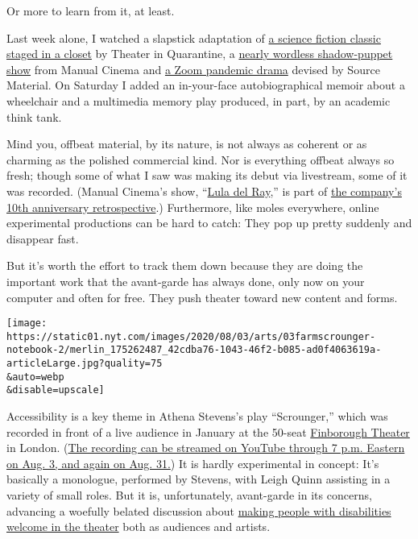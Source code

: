 Or more to learn from it, at least.

Last week alone, I watched a slapstick adaptation of
\href{https://www.nytimes.com/2020/07/31/theater/the-7th-voyage-of-egon-tichy-review.html}{a
science fiction classic staged in a closet} by Theater in Quarantine, a
\href{http://manualcinema.com/watch/}{nearly wordless shadow-puppet
show} from Manual Cinema and
\href{https://www.nytimes.com/2020/07/26/theater/in-these-uncertain-times-review.html}{a
Zoom pandemic drama} devised by Source Material. On Saturday I added an
in-your-face autobiographical memoir about a wheelchair and a multimedia
memory play produced, in part, by an academic think tank.

Mind you, offbeat material, by its nature, is not always as coherent or
as charming as the polished commercial kind. Nor is everything offbeat
always so fresh; though some of what I saw was making its debut via
livestream, some of it was recorded. (Manual Cinema's show,
``\href{https://www.nytimes.com/2017/01/06/theater/lula-del-ray-a-spectral-parade-of-fantastical-images.html}{Lula
del Ray},'' is part of
\href{https://www.nytimes.com/2020/07/23/theater/manual-cinema-puppets-retrospective.html}{the
company's 10th anniversary retrospective}.) Furthermore, like moles
everywhere, online experimental productions can be hard to catch: They
pop up pretty suddenly and disappear fast.

But it's worth the effort to track them down because they are doing the
important work that the avant-garde has always done, only now on your
computer and often for free. They push theater toward new content and
forms.

\texttt{[image: https://static01.nyt.com/images/2020/08/03/arts/03farmscrounger-notebook-2/merlin\_175262487\_42cdba76-1043-46f2-b085-ad0f4063619a-articleLarge.jpg?quality=75\\\&auto=webp\\\&disable=upscale]}

Accessibility is a key theme in Athena Stevens's play ``Scrounger,''
which was recorded in front of a live audience in January at the 50-seat
\href{https://finboroughtheatre.co.uk}{Finborough Theater} in London.
(\href{https://www.youtube.com/watch?v=1o8jvP5djME}{The recording can be
streamed on YouTube through 7 p.m. Eastern on Aug. 3, and again on Aug.
31.}) It is hardly experimental in concept: It's basically a monologue,
performed by Stevens, with Leigh Quinn assisting in a variety of small
roles. But it is, unfortunately, avant-garde in its concerns, advancing
a woefully belated discussion about
\href{https://www.nytimes.com/2020/01/13/theater/under-the-radar-festival-neurodiversity.html}{making
people with disabilities welcome in the theater} both as audiences and
artists.


